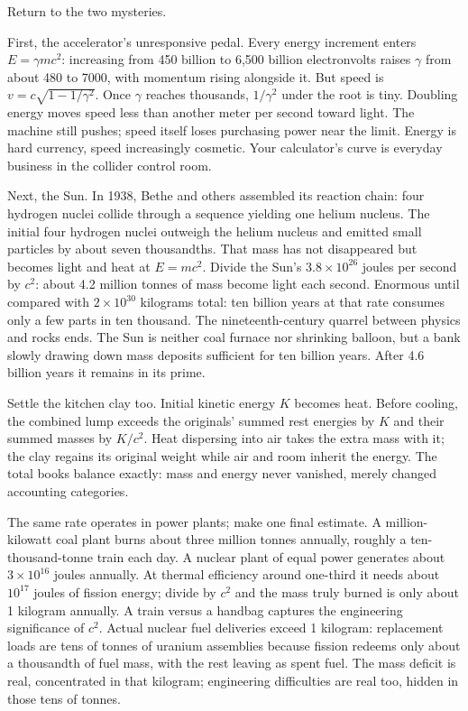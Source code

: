 \begin{mainline}
Return to the two mysteries.

First, the accelerator's unresponsive pedal. Every energy increment enters \(E=\gamma mc^{2}\): increasing from 450 billion to 6,500 billion electronvolts raises \(\gamma\) from about 480 to 7000, with momentum rising alongside it. But speed is \(v=c\sqrt{1-1/\gamma^{2}}\). Once \(\gamma\) reaches thousands, \(1/\gamma^{2}\) under the root is tiny. Doubling energy moves speed less than another meter per second toward light. The machine still pushes; speed itself loses purchasing power near the limit. Energy is hard currency, speed increasingly cosmetic. Your calculator's curve is everyday business in the collider control room.

Next, the Sun. In 1938, Bethe and others assembled its reaction chain: four hydrogen nuclei collide through a sequence yielding one helium nucleus. The initial four hydrogen nuclei outweigh the helium nucleus and emitted small particles by about seven thousandths. That mass has not disappeared but becomes light and heat at \(E=mc^{2}\). Divide the Sun's \(3.8\times10^{26}\) joules per second by \(c^{2}\): about 4.2 million tonnes of mass become light each second. Enormous until compared with \(2\times10^{30}\) kilograms total: ten billion years at that rate consumes only a few parts in ten thousand. The nineteenth-century quarrel between physics and rocks ends. The Sun is neither coal furnace nor shrinking balloon, but a bank slowly drawing down mass deposits sufficient for ten billion years. After 4.6 billion years it remains in its prime.

Settle the kitchen clay too. Initial kinetic energy \(K\) becomes heat. Before cooling, the combined lump exceeds the originals' summed rest energies by \(K\) and their summed masses by \(K/c^{2}\). Heat dispersing into air takes the extra mass with it; the clay regains its original weight while air and room inherit the energy. The total books balance exactly: mass and energy never vanished, merely changed accounting categories.

The same rate operates in power plants; make one final estimate. A million-kilowatt coal plant burns about three million tonnes annually, roughly a ten-thousand-tonne train each day. A nuclear plant of equal power generates about \(3\times10^{16}\) joules annually. At thermal efficiency around one-third it needs about \(10^{17}\) joules of fission energy; divide by \(c^{2}\) and the mass truly burned is only about 1 kilogram annually. A train versus a handbag captures the engineering significance of \(c^{2}\). Actual nuclear fuel deliveries exceed 1 kilogram: replacement loads are tens of tonnes of uranium assemblies because fission redeems only about a thousandth of fuel mass, with the rest leaving as spent fuel. The mass deficit is real, concentrated in that kilogram; engineering difficulties are real too, hidden in those tens of tonnes.
\end{mainline}

